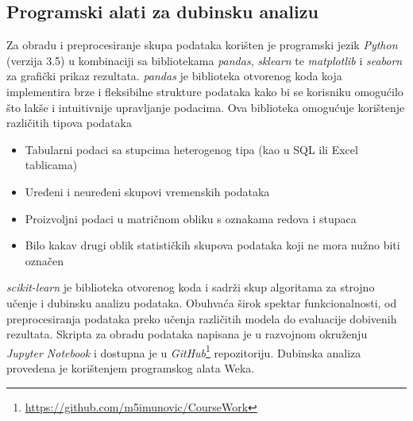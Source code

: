 \subsection{Programski alati za dubinsku analizu}
Za obradu i preprocesiranje skupa podataka korišten je programski jezik \textit{Python} (verzija 3.5)
u kombinaciji sa bibliotekama \textit{pandas}, \textit{sklearn} te \textit{matplotlib} i \textit{seaborn} za grafički prikaz rezultata.
\textit{pandas} je biblioteka otvorenog koda koja implementira brze i fleksibilne strukture podataka kako bi se korisniku omogućilo što lakše i intuitivnije upravljanje podacima\cite{McKinney01}. Ova biblioteka omogućuje korištenje različitih tipova podataka
\begin{itemize}
   \item Tabularni podaci sa stupcima heterogenog tipa (kao u SQL ili Excel tablicama)
   \item Uređeni i neuređeni skupovi vremenskih podataka
   \item Proizvoljni podaci u matričnom obliku s oznakama redova i stupaca
   \item Bilo kakav drugi oblik statističkih skupova podataka koji ne mora nužno biti označen
\end{itemize}

\textit{scikit-learn} je biblioteka otvorenog koda i sadrži skup algoritama za strojno učenje i dubinsku analizu podataka\cite{Pedregosa01}. Obuhvaća širok spektar funkcionalnosti, od preprocesiranja podataka preko učenja različitih modela do evaluacije dobivenih rezultata.
Skripta za obradu podataka napisana je u razvojnom okruženju \textit{Jupyter Notebook} i dostupna je u \textit{GitHub}\footnote{\url{https://github.com/m5imunovic/CourseWork}} repozitoriju. Dubinska analiza provedena je korištenjem programskog alata Weka\cite{Weka01}.

